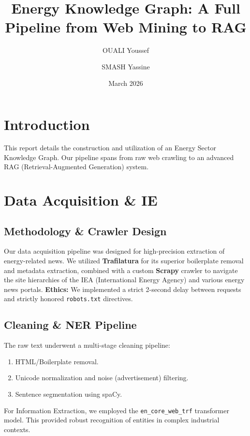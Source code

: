 \documentclass[11pt,a4paper]{article}
\title{\textbf{Energy Knowledge Graph: A Full Pipeline from Web Mining to RAG}}
\author{OUALI Youssef \and SMASH Yassine}
\date{March 2026}
\begin{document}
\maketitle

\section{Introduction}
This report details the construction and utilization of an Energy Sector Knowledge Graph. Our pipeline spans from raw web crawling to an advanced RAG (Retrieval-Augmented Generation) system.

\section{Data Acquisition \& IE}
\subsection{Methodology \& Crawler Design}
Our data acquisition pipeline was designed for high-precision extraction of energy-related news. We utilized \textbf{Trafilatura} for its superior boilerplate removal and metadata extraction, combined with a custom \textbf{Scrapy} crawler to navigate the site hierarchies of the IEA (International Energy Agency) and various energy news portals.
\textbf{Ethics:} We implemented a strict 2-second delay between requests and strictly honored \texttt{robots.txt} directives.

\subsection{Cleaning \& NER Pipeline}
The raw text underwent a multi-stage cleaning pipeline:
\begin{enumerate}
    \item HTML/Boilerplate removal.
    \item Unicode normalization and noise (advertisement) filtering.
    \item Sentence segmentation using spaCy.
\end{enumerate}
For Information Extraction, we employed the \texttt{en\_core\_web\_trf} transformer model. This provided robust recognition of entities in complex industrial contexts.
\end{document}
